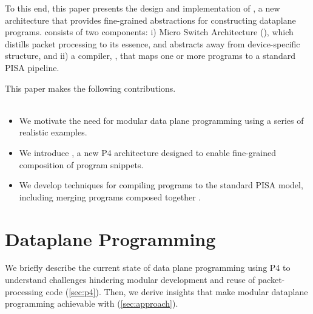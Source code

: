 \documentclass[letterpaper,twocolumn,10pt]{article}
\begin{document}
To this end, this paper presents the design and implementation of
\ulang, a new architecture that provides fine-grained abstractions for
constructing dataplane programs. \ulang consists of two components: i)
Micro Switch Architecture (\uarch), which distills packet processing
to its essence, and abstracts away from device-specific structure, and
ii) a compiler, \ucomp, that maps one or more \uarch programs to a
standard PISA pipeline.
\\

This paper makes the following contributions.\\
\\
\begin{itemize}
\item We motivate the need for modular data plane programming using a
  series of realistic examples.
\item We introduce \uarch, a new P4 architecture designed to enable
  fine-grained composition of program snippets.
\item We develop techniques for compiling \uarch programs to the
  standard PISA model, including merging programs composed together 
  .
\end{itemize}





\section{Dataplane Programming}
\label{sec:background}

We briefly describe the current state of data plane programming using
P4 to understand challenges hindering modular development and reuse of
packet-processing code (\cref{sec:p4}). Then, we derive insights that
make modular dataplane programming achievable with \ulang
(\cref{sec:approach}).
\end{document}
